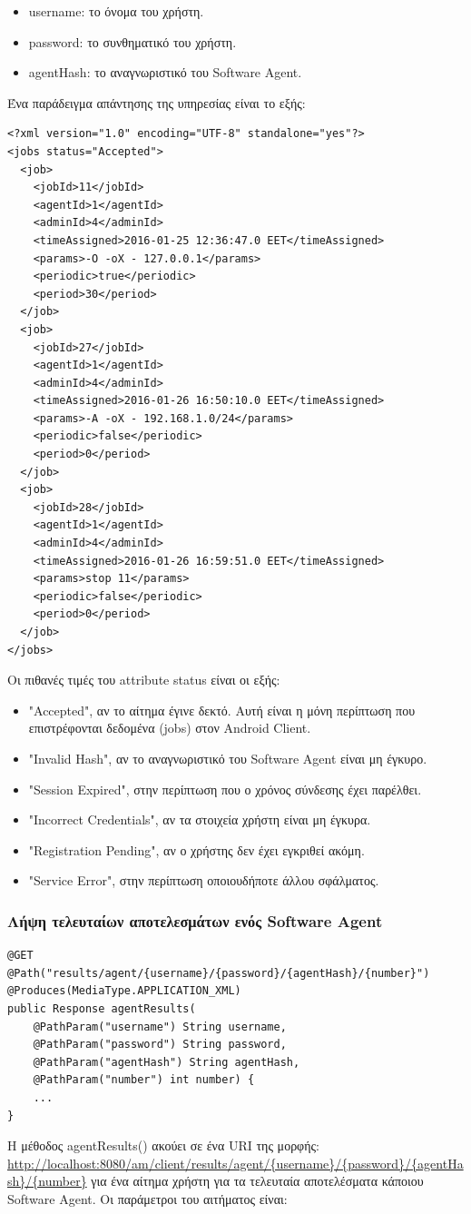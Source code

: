\documentclass[a4paper,11pt]{article}
\begin{document}
\begin{sloppypar}
\begin{itemize}
\item username: το όνομα του χρήστη.
\item password: το συνθηματικό του χρήστη.
\item agentHash: το αναγνωριστικό του Software Agent.

\end{itemize}
Ένα παράδειγμα απάντησης της υπηρεσίας είναι το εξής:
\begin{lstlisting}
<?xml version="1.0" encoding="UTF-8" standalone="yes"?>
<jobs status="Accepted">
  <job>
    <jobId>11</jobId>
    <agentId>1</agentId>
    <adminId>4</adminId>
    <timeAssigned>2016-01-25 12:36:47.0 EET</timeAssigned>
    <params>-O -oX - 127.0.0.1</params>
    <periodic>true</periodic>
    <period>30</period>
  </job>
  <job>
    <jobId>27</jobId>
    <agentId>1</agentId>
    <adminId>4</adminId>
    <timeAssigned>2016-01-26 16:50:10.0 EET</timeAssigned>
    <params>-A -oX - 192.168.1.0/24</params>
    <periodic>false</periodic>
    <period>0</period>
  </job>
  <job>
    <jobId>28</jobId>
    <agentId>1</agentId>
    <adminId>4</adminId>
    <timeAssigned>2016-01-26 16:59:51.0 EET</timeAssigned>
    <params>stop 11</params>
    <periodic>false</periodic>
    <period>0</period>
  </job>
</jobs>
\end{lstlisting}
Οι πιθανές τιμές του attribute status είναι οι εξής:
\begin{itemize}
\item "Accepted", αν το αίτημα έγινε δεκτό. Αυτή είναι η μόνη περίπτωση που επιστρέφονται δεδομένα (jobs) στον Android Client.
\item "Invalid Hash", αν το αναγνωριστικό του Software Agent είναι μη έγκυρο.
\item "Session Expired", στην περίπτωση που ο χρόνος σύνδεσης έχει παρέλθει.
\item "Incorrect Credentials", αν τα στοιχεία χρήστη είναι μη έγκυρα.
\item "Registration Pending", αν ο χρήστης δεν έχει εγκριθεί ακόμη.
\item "Service Error", στην περίπτωση οποιουδήποτε άλλου σφάλματος.
\end{itemize}

\subsubsection{Λήψη τελευταίων αποτελεσμάτων ενός Software Agent}
\begin{lstlisting}
@GET
@Path("results/agent/{username}/{password}/{agentHash}/{number}")
@Produces(MediaType.APPLICATION_XML)
public Response agentResults(
    @PathParam("username") String username,
    @PathParam("password") String password,
    @PathParam("agentHash") String agentHash,
    @PathParam("number") int number) {
    ...
}
\end{lstlisting}
Η μέθοδος agentResults() ακούει σε ένα URI της μορφής:
\\
\url{http://localhost:8080/am/client/results/agent/{username}/{password}/{agentHash}/{number}} για ένα αίτημα χρήστη για τα τελευταία αποτελέσματα κάποιου Software Agent. Οι παράμετροι του αιτήματος είναι:
\begin{itemize}


\end{itemize}
\end{sloppypar}
\end{document}
